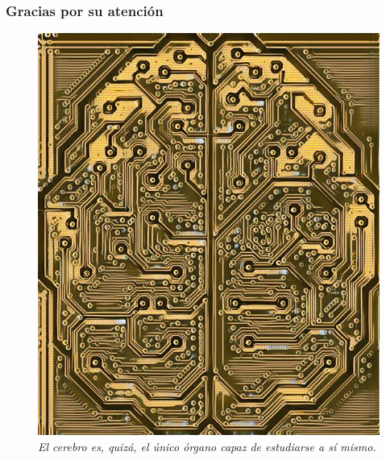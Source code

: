 \documentclass{beamer}
\begin{document}

%


%



\begin{frame}\frametitle{Gracias por su atenci\'on}
\begin{figure}
\centering
\includegraphics[width=0.4\linewidth]{cerebot.jpg}\\
\vspace*{1em}
\textit{El cerebro es, quiz\'a, el \'unico \'organo capaz de estudiarse a s\'i mismo.}
\end{figure}
\end{frame}

\end{document}
